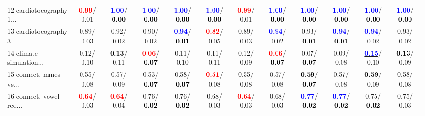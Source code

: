 \begin{table}[h]
\begin{center}
{\begin{tabular}{lc|c|c|c|c|c|c|c|c|c|c}
12-cardiotocography 1... & \textcolor{red}{\textbf{  0.99}}/  0.01 & \textcolor{blue}{\textbf{  1.00}}/\textcolor{black}{\textbf{  0.00}} & \textcolor{blue}{\textbf{  1.00}}/\textcolor{black}{\textbf{  0.00}} & \textcolor{blue}{\textbf{  1.00}}/\textcolor{black}{\textbf{  0.00}} & \textcolor{blue}{\textbf{  1.00}}/\textcolor{black}{\textbf{  0.00}} & \textcolor{red}{\textbf{  0.99}}/  0.01 & \textcolor{blue}{\textbf{  1.00}}/\textcolor{black}{\textbf{  0.00}} & \textcolor{blue}{\textbf{  1.00}}/\textcolor{black}{\textbf{  0.00}} & \textcolor{blue}{\textbf{  1.00}}/\textcolor{black}{\textbf{  0.00}} & \textcolor{blue}{\textbf{  1.00}}/\textcolor{black}{\textbf{  0.00}} & \textcolor{blue}{\textbf{  1.00}}/\textcolor{black}{\textbf{  0.00}} \\
13-cardiotocography 3... &   0.89/  0.03 &   0.92/  0.02 &   0.90/  0.02 & \textcolor{blue}{\textbf{  0.94}}/\textcolor{black}{\textbf{  0.01}} & \textcolor{red}{\textbf{  0.82}}/  0.05 &   0.89/  0.03 & \textcolor{blue}{\textbf{  0.94}}/  0.02 &   0.93/\textcolor{black}{\textbf{  0.01}} & \textcolor{blue}{\textbf{  0.94}}/\textcolor{black}{\textbf{  0.01}} & \textcolor{blue}{\textbf{  0.94}}/  0.02 &   0.93/  0.02 \\
14-climate simulation... &   0.12/  0.10 & \textcolor{black}{\textbf{  0.13}}/  0.11 & \textcolor{red}{\textbf{  0.06}}/\textcolor{black}{\textbf{  0.07}} &   0.11/  0.10 &   0.11/  0.11 &   0.12/  0.09 & \textcolor{red}{\textbf{  0.06}}/\textcolor{black}{\textbf{  0.07}} &   0.07/\textcolor{black}{\textbf{  0.07}} &   0.09/  0.08 & \underline{\textcolor{blue}{\textbf{  0.15}}}/  0.10 & \textcolor{black}{\textbf{  0.13}}/  0.09 \\ \hline
15-connect. mines vs... &   0.55/  0.08 &   0.57/  0.09 &   0.53/\textcolor{black}{\textbf{  0.07}} &   0.58/\textcolor{black}{\textbf{  0.07}} & \textcolor{red}{\textbf{  0.51}}/  0.08 &   0.55/  0.08 &   0.57/  0.08 & \textcolor{black}{\textbf{  0.59}}/\textcolor{black}{\textbf{  0.07}} &   0.57/  0.08 & \textcolor{black}{\textbf{  0.59}}/  0.09 &   0.58/  0.08 \\
16-connect. vowel red... & \textcolor{red}{\textbf{  0.64}}/  0.03 & \textcolor{red}{\textbf{  0.64}}/  0.04 &   0.76/\textcolor{black}{\textbf{  0.02}} &   0.76/\textcolor{black}{\textbf{  0.02}} &   0.68/  0.03 & \textcolor{red}{\textbf{  0.64}}/  0.03 &   0.68/  0.03 & \textcolor{blue}{\textbf{  0.77}}/\textcolor{black}{\textbf{  0.02}} & \textcolor{blue}{\textbf{  0.77}}/\textcolor{black}{\textbf{  0.02}} &   0.75/\textcolor{black}{\textbf{  0.02}} &   0.75/  0.03 \\

\end{tabular}}
\end{center}
\end{table}
